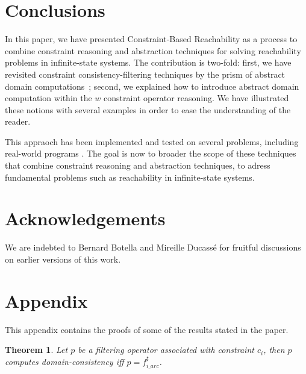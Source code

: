 \documentclass[submission,copyright,creativecommons]{eptcs}
\newtheorem{theorem}{Theorem}
\newcommand{\sh}[1]{\ensuremath{#1^\sharp}}
\begin{document}
\section{Conclusions}

In this paper, we have presented Constraint-Based Reachability as a process to combine constraint reasoning and abstraction techniques for solving reachability problems in infinite-state systems. The contribution is two-fold: first, we have revisited constraint consistency-filtering techniques by the prism of abstract domain computations~; second, we explained how to introduce abstract domain computation within the $w$ constraint operator reasoning. We have illustrated these notions with several examples in order to ease the understanding of the reader.

This appraoch has been implemented and tested on several problems, including real-world programs \cite{Got09,Got12}. The goal is now to broader the scope of these techniques that combine constraint reasoning and abstraction techniques, to adress fundamental problems such as reachability in infinite-state systems.  


\section*{Acknowledgements}
We are indebted to Bernard Botella and Mireille Ducass\'e for fruitful discussions on earlier versions of this work.

\section*{Appendix}
This appendix contains the proofs of some of the results stated in the paper.
\bigskip

\begin{theorem}
\label{theo:arc}
  Let $p$ be a filtering operator associated with constraint $c_i$, then $p$ computes domain-consistency iff
  $p = \sh{f_{i\_arc}}$. 
\end{theorem}
\end{document}
